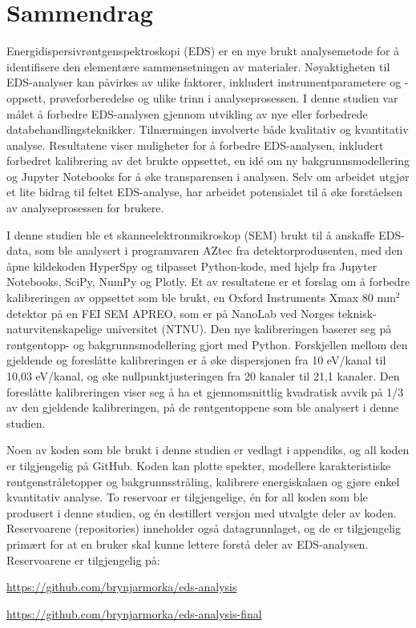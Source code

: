 \chapter*{Sammendrag}

Energidispersivrøntgenspektroskopi (EDS) er en mye brukt analysemetode for å identifisere den elementære sammensetningen av materialer.
Nøyaktigheten til EDS-analyser kan påvirkes av ulike faktorer, inkludert instrumentparametere og -oppsett, prøveforberedelse og ulike trinn i analyseprosessen.
I denne studien var målet å forbedre EDS-analysen gjennom utvikling av nye eller forbedrede databehandlingsteknikker.
Tilnærmingen involverte både kvalitativ og kvantitativ analyse.
Resultatene viser muligheter for å forbedre EDS-analysen, inkludert forbedret kalibrering av det brukte oppsettet, en idé om ny bakgrunnsmodellering og Jupyter Notebooks for å øke transparensen i analysen.
Selv om arbeidet utgjør et lite bidrag til feltet EDS-analyse, har arbeidet potensialet til å øke forståelsen av analyseprosessen for brukere.



I denne studien ble et skanneelektronmikroskop (SEM) brukt til å anskaffe EDS-data, som ble analysert i programvaren AZtec fra detektorprodusenten, med den åpne kildekoden HyperSpy og tilpasset Python-kode, med hjelp fra Jupyter Notebooks, SciPy, NumPy og Plotly.
Et av resultatene er et forslag om å forbedre kalibreringen av oppsettet som ble brukt, en Oxford Instruments Xmax 80 mm$^2$ detektor på en FEI SEM APREO, som er på NanoLab ved Norges teknisk-naturvitenskapelige universitet (NTNU).
Den nye kalibreringen baserer seg på røntgentopp- og bakgrunnsmodellering gjort med Python.
Forskjellen mellom den gjeldende og foreslåtte kalibreringen er å øke dispersjonen fra 10 eV/kanal til 10,03 eV/kanal, og øke nullpunktjusteringen fra 20 kanaler til 21,1 kanaler.
Den foreslåtte kalibreringen viser seg å ha et gjennomsnittlig kvadratisk avvik på 1/3 av den gjeldende kalibreringen, på de røntgentoppene som ble analysert i denne studien.



Noen av koden som ble brukt i denne studien er vedlagt i appendiks, og all koden er tilgjengelig på GitHub.
Koden kan plotte spekter, modellere karakteristiske røntgenstråletopper og bakgrunnsstråling, kalibrere energiskalaen og gjøre enkel kvantitativ analyse.
To reservoar er tilgjengelige, én for all koden som ble produsert i denne studien, og én destillert versjon med utvalgte deler av koden.
Reservoarene (repositories) inneholder også datagrunnlaget, og de er tilgjengelig primært for at en bruker skal kunne lettere forstå deler av EDS-analysen.
Reservoarene er tilgjengelig på:



\url{https://github.com/brynjarmorka/eds-analysis}

\url{https://github.com/brynjarmorka/eds-analysis-final}


